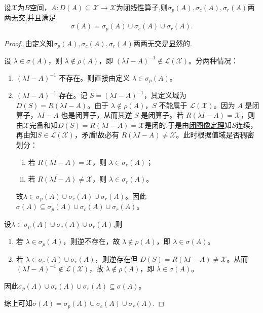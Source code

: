 \documentclass[../../main.tex]{subfiles}%
\begin{document}
\begin{proposition}
设$\mathscr{X}$为$B$空间，$A:D(A)\subseteq\mathscr{X}\to\mathscr{X}$为闭线性算子,则$\sigma_p(A),\sigma_c(A),\sigma_r(A)$两两无交,并且满足
$$\sigma(A)=\sigma_p(A)\cup\sigma_c(A)\cup\sigma_r(A).$$
\end{proposition}
\begin{proof}
由定义知$\sigma_p(A),\sigma_c(A),\sigma_r(A)$两两无交是显然的.

设 $\lambda \in \sigma(A)$，则 $\lambda \notin \rho(A)$，即 $(\lambda I - A)^{-1} \notin \mathscr{L}(\mathscr{X})$。分两种情况：
\begin{enumerate}[(1)]
\item $(\lambda I - A)^{-1}$ 不存在。则直接由定义 $\lambda \in \sigma_p(A)$。

\item $(\lambda I - A)^{-1}$ 存在。记 $S = (\lambda I - A)^{-1}$，其定义域为 $D(S) = R(\lambda I - A)$。由于 $\lambda \notin \rho(A)$，$S$ 不能属于 $\mathscr{L}(\mathscr{X})$。因为 $A$ 是闭算子，$\lambda I - A$ 也是闭算子，从而其逆 $S$ 是闭算子。若 $R(\lambda I - A) = \mathscr{X}$，则由$\mathscr{X}$完备和知$D(S)=R(\lambda I-A)=\mathscr{X}$是闭的.于是由\hyperref[theorem:泛函分析--闭图像定理]{闭图像定理}知$S$连续，再由知$S \in \mathscr{L}(\mathscr{X})$，矛盾!故必有 $R(\lambda I - A) \neq \mathscr{X}$。此时根据值域是否稠密划分：
\begin{enumerate}[(i)]
\item 若 $\overline{R(\lambda I - A)} = \mathscr{X}$，则 $\lambda \in \sigma_c(A)$；

\item 若 $\overline{R(\lambda I - A)} \neq \mathscr{X}$，则 $\lambda \in \sigma_r(A)$。
\end{enumerate}
故$\lambda \in \sigma_p(A) \cup \sigma_c(A) \cup \sigma_r(A)$。因此 $\sigma(A) \subseteq \sigma_p(A) \cup \sigma_c(A) \cup \sigma_r(A)$。
\end{enumerate}

设$\lambda \in \sigma_p(A) \cup \sigma_c(A) \cup \sigma_r(A)$,则
\begin{enumerate}[(1)]
\item 若 $\lambda \in \sigma_p(A)$，则逆不存在，故 $\lambda \notin \rho(A)$，即 $\lambda \in \sigma(A)$。

\item 若 $\lambda \in \sigma_c(A) \cup \sigma_r(A)$，则逆存在但 $D(S)=R(\lambda I - A) \neq \mathscr{X}$。从而 $(\lambda I - A)^{-1} \notin \mathscr{L}(\mathscr{X})$，故 $\lambda \notin \rho(A)$，即 $\lambda \in \sigma(A)$。
\end{enumerate}
因此$\sigma_p(A) \cup \sigma_c(A) \cup \sigma_r(A) \subseteq \sigma(A)$。

综上可知$\sigma(A) = \sigma_p(A) \cup \sigma_c(A) \cup \sigma_r(A)$.
\end{proof}
\end{document}

